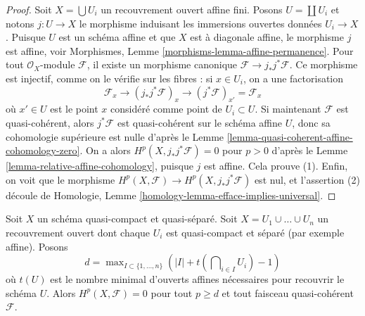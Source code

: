 \begin{proof}
Soit $X = \bigcup U_i$ un recouvrement ouvert affine fini.
Posons $U = \coprod U_i$ et notons $j : U \to X$
le morphisme induisant les immersions ouvertes données $U_i \to X$.
Puisque $U$ est un schéma affine et que $X$ est à diagonale affine,
le morphisme $j$ est affine, voir
Morphismes, Lemme \ref{morphisms-lemma-affine-permanence}.
Pour tout $\mathcal{O}_X$-module $\mathcal{F}$, il existe
un morphisme canonique $\mathcal{F} \to j_*j^*\mathcal{F}$.
Ce morphisme est injectif, comme on le vérifie sur les fibres :
si $x \in U_i$, on a une factorisation
$$
\mathcal{F}_x \to (j_*j^*\mathcal{F})_x
\to (j^*\mathcal{F})_{x'} = \mathcal{F}_x
$$
où $x' \in U$ est le point $x$ considéré comme point de $U_i \subset U$.
Si maintenant $\mathcal{F}$ est quasi-cohérent, alors $j^*\mathcal{F}$
est quasi-cohérent sur le schéma affine $U$, donc sa cohomologie
supérieure est nulle d'après le
Lemme \ref{lemma-quasi-coherent-affine-cohomology-zero}.
On a alors $H^p(X, j_*j^*\mathcal{F}) = 0$ pour
$p > 0$ d'après le Lemme \ref{lemma-relative-affine-cohomology},
puisque $j$ est affine. Cela prouve (1).
Enfin, on voit que le morphisme
$H^p(X, \mathcal{F}) \to H^p(X, j_*j^*\mathcal{F})$
est nul, et l'assertion (2) découle de
Homologie, Lemme \ref{homology-lemma-efface-implies-universal}.
\end{proof}

\begin{lemma}
\label{lemma-vanishing-nr-affines-quasi-separated}
Soit $X$ un schéma quasi-compact et quasi-séparé.
Soit $X = U_1 \cup \ldots \cup U_n$ un recouvrement ouvert
dont chaque $U_i$ est quasi-compact et séparé (par exemple affine).
Posons
$$
d = \max\nolimits_{I \subset \{1, \ldots, n\}}
\left(|I| + t(\bigcap\nolimits_{i \in I} U_i) - 1\right)
$$
où $t(U)$ est le nombre minimal d'ouverts affines nécessaires pour recouvrir
le schéma $U$. Alors $H^p(X, \mathcal{F}) = 0$ pour tout $p \geq d$ et tout
faisceau quasi-cohérent $\mathcal{F}$.
\end{lemma}

